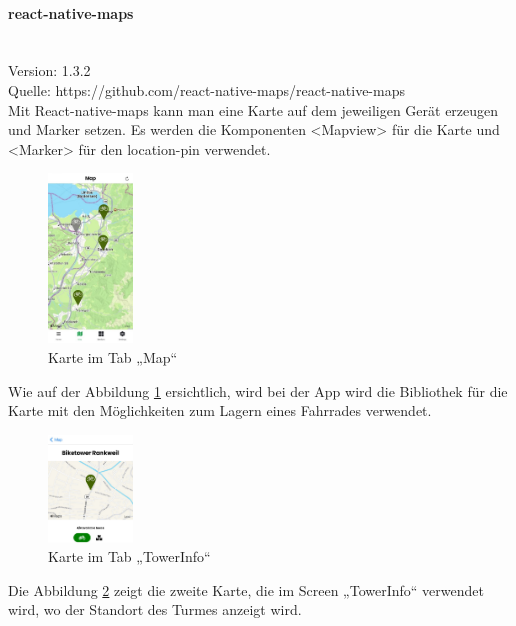 \paragraph{react-native-maps}\mbox{}\\
Version: 1.3.2\\
Quelle: https://github.com/react-native-maps/react-native-maps\\
Mit React-native-maps kann man eine Karte auf dem jeweiligen Gerät erzeugen und Marker setzen. Es werden die Komponenten <Mapview> für die Karte und <Marker> für den location-pin verwendet.  \\
\begin{figure}[H]
    \centering
    \includegraphics[width=0.2\textwidth]{images/app-screenshots/tabmap.jpg}
    \caption{Karte im Tab „Map“}
    \label{fig:tabmap}
\end{figure}
Wie auf der Abbildung \ref*{fig:tabmap} ersichtlich, wird bei der App wird die Bibliothek für die Karte mit den Möglichkeiten zum Lagern eines Fahrrades verwendet. \\ 
\begin{figure}[H]
    \centering
    \includegraphics[width=0.2\textwidth]{images/app-screenshots/smallmap.png}
    \caption{Karte im Tab „TowerInfo“}
    \label{fig:smallmap}
\end{figure}
Die Abbildung \ref{fig:smallmap} zeigt die zweite Karte, die im Screen „TowerInfo“ verwendet wird, wo der Standort des Turmes anzeigt wird.\\


